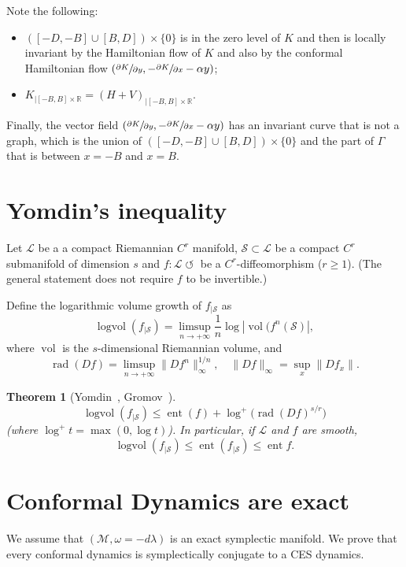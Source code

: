 \documentclass[11pt]{article}
\newcommand{\skpt}{\smallskip}
\numberwithin{equation}{section}
\numberwithin{figure}{section}
\numberwithin{table}{section}
\providecommand{\righttoleftarrow}{\mathrel{\circlearrowleft}}
\newtheorem{theorem}{Theorem}
\theoremstyle{definition}
\def\R{\mathbb{R}}
\def\cL{{\mathcal L}}
\def\cM{{\mathcal M}}
\def\cS{{\mathcal S}}
\DeclareMathOperator{\ent}{ent}
\DeclareMathOperator\logvol{logvol}
\DeclareMathOperator\rad{rad}
\DeclareMathOperator\vol{vol}
\begin{document}
Note the following:
\begin{itemize}
\item $([-D, -B]\cup[B, D])\times\{ 0\}$ is in the zero level of $K$ and then is locally inva\-riant by the Hamiltonian flow of $K$ and also by the conformal Hamiltonian flow \hbox{$(\sfrac{\partial K}{\partial y}, -\sfrac{\partial K}{\partial x}-\alpha y)$};
\item $K_{|[-B, B]\times \R}=(H+V)_{|[-B, B]\times \R}$.
\end{itemize}
Finally, the vector field $(\sfrac{\partial K}{\partial y}, -\sfrac{\partial K}{\partial x}-\alpha y)$ has an invariant curve that is not a graph, which is the union of $([-D, -B]\cup[B, D])\times\{ 0\}$ and the part of $\Gamma$ that is between $x=-B$ and $x=B$.

\appendix

\section{Yomdin's inequality}
\label{AYomdin}

Let $\cL$ be a a compact Riemannian $C^r$ manifold, $\cS \subset \cL$ be a compact $C^r$ submanifold of dimension $s$ and $f : \cL \righttoleftarrow$ be a { $C^r$-diffeomorphism} ($r \geq 1$). (The general statement does not require $f$ to be invertible.)

Define the logarithmic volume growth of $f_{|\cS}$ as
\[
\logvol(f_{|\cS}) = \limsup_{n \to +\infty} \frac{1}{n} \log | \vol(f^{n}(\cS)|,
\]
where $\vol$ is the $s$-dimensional Riemannian volume, and
\[
\rad (Df) = \limsup_{n \to +\infty} \|Df^n\|_\infty^{1/n}, \quad \|Df\|_\infty = \sup_x \|Df_x\|.
\]

\skpt\begin{theorem}[Yomdin~\cite{Yom1987}, Gromov~\cite{Gromov1987}]\mbox{}\vspace*{-\baselineskip}
\[
\logvol (f_{|\cS}) \leq \ent (f) + \log^+\bigl(\rad(Df)^{s/r}\bigr)
\]
(where $\log^+ t = \max (0, \log t)$). In particular, if $\cL$ and $f$ are smooth,
\[
\logvol (f_{|\cS}) \leq \ent (f_{|\cS}) \leq \ent f.
\]
\end{theorem}

\section{Conformal Dynamics are exact} \label{Aconfexact}

We assume that $(\cM, \omega=-d\lambda)$ is an exact symplectic manifold. We prove that every conformal dynamics is symplectically conjugate to a CES dynamics.
\end{document}
